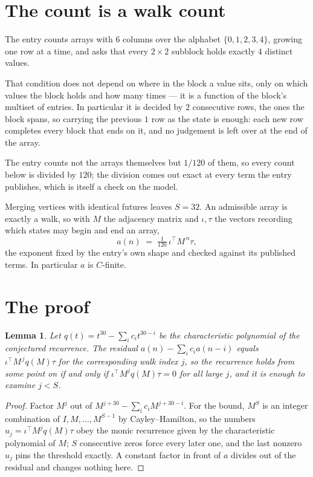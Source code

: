 \documentclass[11pt,a4paper]{article}
\theoremstyle{plain}
\newtheorem{lemma}[theorem]{Lemma}
\theoremstyle{definition}
\begin{document}
\section{The count is a walk count}

The entry counts arrays with $6$ columns over the alphabet $\{0,1,2,3,4\}$, growing one row at a time, and asks that every $2\times2$ subblock holds exactly $4$ distinct values.

That condition does not depend on where in the block a value sits, only on which values the block holds and how many times --- it is a function of the block's multiset of entries. In particular it is decided by $2$ consecutive rows, the ones the block spans, so carrying the previous $1$ row as the state is enough: each new row completes every block that ends on it, and no judgement is left over at the end of the array.

The entry counts not the arrays themselves but $1/120$ of them, so every count below is divided by $120$; the division comes out exact at every term the entry publishes, which is itself a check on the model.

Merging vertices with identical futures leaves $S=32$. An admissible array is exactly a walk, so with $M$ the adjacency matrix and $\iota,\tau$ the vectors recording which states may begin and end an array,
\[
a(n)\;=\;\tfrac{1}{120}\,\iota^{\!\top}M^{\,n}\tau ,
\]
the exponent fixed by the entry's own shape and checked against its published terms. In
particular $a$ is $C$-finite.

\section{The proof}

\begin{lemma}\label{lem:crit}
Let $q(t)=t^{30}-\sum_i c_it^{30-i}$ be the characteristic polynomial of the
conjectured recurrence. The residual $a(n)-\sum_ic_ia(n-i)$ equals
$\iota^{\!\top}M^{\,j}q(M)\tau$ for the corresponding walk index $j$, so the recurrence
holds from some point on if and only if $\iota^{\!\top}M^{j}q(M)\tau=0$ for all large $j$,
and it is enough to examine $j<S$.
\end{lemma}

\begin{proof}
Factor $M^{j}$ out of $M^{j+30}-\sum_ic_iM^{j+30-i}$. For the bound, $M^{S}$
is an integer combination of $I,M,\dots,M^{S-1}$ by Cayley--Hamilton, so the numbers
$u_j=\iota^{\!\top}M^{j}q(M)\tau$ obey the monic recurrence given by the characteristic
polynomial of $M$; $S$ consecutive zeros force every later one, and the last nonzero $u_j$
pins the threshold exactly. A constant factor in front of $a$ divides out of the residual and
changes nothing here.
\end{proof}
\end{document}
